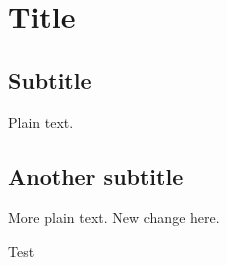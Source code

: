 \documentclass{article}
\begin{document}


\section{Title}

\subsection{Subtitle}

Plain text.

\subsection{Another subtitle}

More plain text. New change here.

Test
\end{document}
